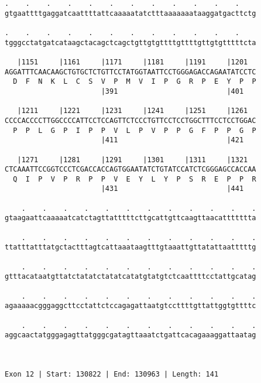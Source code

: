 \documentclass{article}
\begin{document}
\begin{Verbatim}
.    .    .    .    .    .    .    .    .    .    .    .    
gtgaattttgaggatcaattttattcaaaaatatctttaaaaaaataaggatgacttctg
                                                            
.    .    .    .    .    .    .    .    .    .    .    .    
tgggcctatgatcataagctacagctcagctgttgtgttttgttttgttgtgtttttcta
                                                            
   |1151     |1161     |1171     |1181     |1191     |1201  
AGGATTTCAACAAGCTGTGCTCTGTTCCTATGGTAATTCCTGGGAGACCAGAATATCCTC
  D  F  N  K  L  C  S  V  P  M  V  I  P  G  R  P  E  Y  P  P
                       |391                          |401   
  
   |1211     |1221     |1231     |1241     |1251     |1261  
CCCCACCCCTTGGCCCCATTCCTCCAGTTCTCCCTGTTCCTCCTGGCTTTCCTCCTGGAC
  P  P  L  G  P  I  P  P  V  L  P  V  P  P  G  F  P  P  G  P
                       |411                          |421   
  
   |1271     |1281     |1291     |1301     |1311     |1321  
CTCAAATTCCGGTCCCTCGACCACCAGTGGAATATCTGTATCCATCTCGGGAGCCACCAA
  Q  I  P  V  P  R  P  P  V  E  Y  L  Y  P  S  R  E  P  P  R
                       |431                          |441   
  
    .    .    .    .    .    .    .    .    .    .    .    .
gtaagaattcaaaaatcatctagttatttttcttgcattgttcaagttaacattttttta
                                                            
    .    .    .    .    .    .    .    .    .    .    .    .
ttatttatttatgctactttagtcattaaataagtttgtaaattgttatattaatttttg
                                                            
    .    .    .    .    .    .    .    .    .    .    .    .
gtttacataatgttatctatatctatatcatatgtatgtctcaattttcctattgcatag
                                                            
    .    .    .    .    .    .    .    .    .    .    .    .
agaaaaacgggaggcttcctattctccagagattaatgtccttttgttattggtgttttc
                                                            
    .    .    .    .    .    .    .    .    .    .    .    .
aggcaactatgggagagttatgggcgatagttaaatctgattcacagaaaggattaatag
                                                            
                                                            
 
Exon 12 | Start: 130822 | End: 130963 | Length: 141
 

\end{Verbatim}
\end{document}
